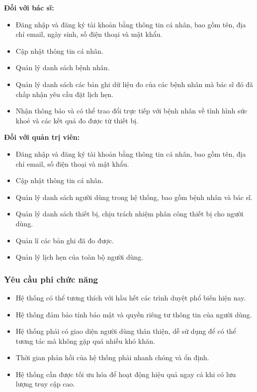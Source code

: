 \textbf{Đối với bác sĩ:}
\begin{adjustwidth}{1.5em}{}
\begin{itemize}
    \item Đăng nhập và đăng ký tài khoản bằng thông tin cá nhân, bao gồm tên, địa chỉ email, ngày sinh, số điện thoại và mật khẩu.
    \item Cập nhật thông tin cá nhân.
    \item Quản lý danh sách bệnh nhân.
    \item Quản lý danh sách các bản ghi dữ liệu đo của các bệnh nhân mà bác sĩ đó đã chấp nhận yêu cầu đặt lịch hẹn.
    \item Nhận thông báo và có thể trao đổi trực tiếp với bệnh nhân về tình hình sức khoẻ và các kết quả đo được từ thiết bị.
\end{itemize}
\end{adjustwidth}
\textbf{Đối với quản trị viên:}
\begin{adjustwidth}{1.5em}{}
\begin{itemize}
    \item Đăng nhập và đăng ký tài khoản bằng thông tin cá nhân, bao gồm tên, địa chỉ email, số điện thoại và mật khẩu.
    \item Cập nhật thông tin cá nhân.
    \item Quản lý danh sách người dùng trong hệ thống, bao gồm bệnh nhân và bác sĩ.
    \item Quản lý danh sách thiết bị, chịu trách nhiệm phân công thiết bị cho người dùng.
    \item Quản lí các bản ghi đã đo được.
    \item Quản lý lịch hẹn của toàn bộ người dùng.
\end{itemize}
\end{adjustwidth}

\subsubsection{Yêu cầu phi chức năng}
\begin{itemize}
    \item Hệ thống có thể tương thích với hầu hết các trình duyệt phổ biến hiện nay.
    \item Hệ thống đảm bảo tính bảo mật và quyền riêng tư thông tin của người dùng.
    \item Hệ thống phải có giao diện người dùng thân thiện, dễ sử dụng để có thể tương tác mà không gặp quá nhiều khó khăn.
    \item Thời gian phản hồi của hệ thống phải nhanh chóng và ổn định.
    \item Hệ thống cần được tối ưu hóa để hoạt động hiệu quả ngay cả khi có lưu lượng truy cập cao.
\end{itemize}

